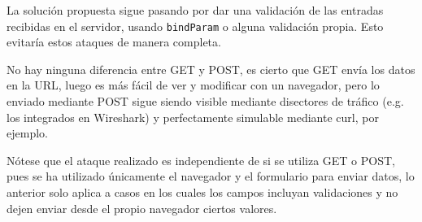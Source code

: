 \documentclass{article}
\begin{document}
La solución propuesta sigue pasando por dar una validación de las entradas recibidas en el servidor, usando \texttt{bindParam} o alguna validación propia. Esto evitaría estos ataques de manera completa.

No hay ninguna diferencia entre GET y POST, es cierto que GET envía los datos en la URL, luego es más fácil de ver y modificar con un navegador, pero lo enviado mediante POST sigue siendo visible mediante disectores de tráfico (e.g. los integrados en Wireshark) y perfectamente simulable mediante curl, por ejemplo.

Nótese que el ataque realizado es independiente de si se utiliza GET o POST, pues se ha utilizado únicamente el navegador y el formulario para enviar datos, lo anterior solo aplica a casos en los cuales los campos incluyan validaciones y no dejen enviar desde el propio navegador ciertos valores.
\end{document}
